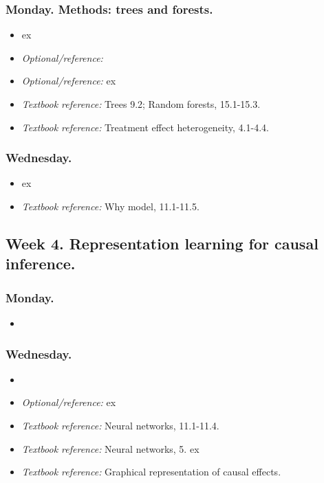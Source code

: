 \documentclass[letterpaper, 12pt, parskip=full,DIV=10]{scrartcl}
\begin{document}
\subsubsection*{Monday. Methods: trees and forests.}

\begin{itemize}
\item {} ex
\item \textit{Optional/reference:} 
\item \textit{Optional/reference:}  ex
\item \textit{Textbook reference:}  Trees 9.2; Random forests, 15.1-15.3.
\item \textit{Textbook reference:}  Treatment effect heterogeneity, 4.1-4.4.
\end{itemize}

\subsubsection*{Wednesday.}
\begin{itemize}
\item {} ex
\item \textit{Textbook reference:}  Why model, 11.1-11.5. 
\end{itemize}


\subsection*{Week 4. Representation learning for causal inference.}

\subsubsection*{Monday.}
\begin{itemize}
\item {}
\end{itemize}

\subsubsection*{Wednesday.}
\begin{itemize}
\item {}
\item \textit{Optional/reference:}  ex
\item \textit{Textbook reference:}  Neural networks, 11.1-11.4.
\item \textit{Textbook reference:}  Neural networks, 5. ex
\item \textit{Textbook reference:}  Graphical representation of causal effects. 
\end{itemize}
\end{document}

